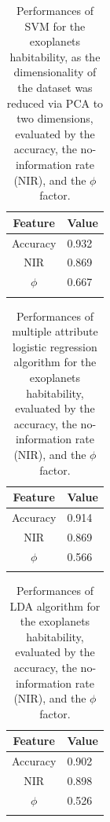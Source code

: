 \documentclass[
12pt, %
a4paper, %
oneside, %
headinclude,footinclude, %
BCOR5mm, %
]{scrartcl}
\begin{document}
\begin{table}[]
\caption{Performances of SVM for the exoplanets habitability, as the dimensionality of the dataset was reduced via PCA to two dimensions, evaluated by the accuracy, the no-information rate (NIR), and the $\phi$ factor.}
\begin{center}
\begin{tabular}{l|l}
\multicolumn{1}{c|}{Feature} & Value \\ \hline
\multicolumn{1}{c|}{Accuracy} & 0.932 \\ \hline
\multicolumn{1}{c|}{NIR} & 0.869 \\ \hline
\multicolumn{1}{c|}{$\phi$} & 0.667 \\ 
\label{SVM+PCA_perf_tab}
\end{tabular}
\end{center}
\end{table}

\begin{table}[]
\caption{Performances of multiple attribute logistic regression algorithm for the exoplanets habitability, evaluated by the accuracy, the no-information rate (NIR), and the $\phi$ factor.}
\begin{center}
\begin{tabular}{l|l}
\multicolumn{1}{c|}{Feature} & Value \\ \hline
\multicolumn{1}{c|}{Accuracy} & 0.914 \\ \hline
\multicolumn{1}{c|}{NIR} & 0.869 \\ \hline
\multicolumn{1}{c|}{$\phi$} & 0.566 \\ 
\label{LDA_perf_tab}
\end{tabular}
\end{center}
\end{table}

\begin{table}[]
\caption{Performances of LDA algorithm for the exoplanets habitability, evaluated by the accuracy, the no-information rate (NIR), and the $\phi$ factor.}
\begin{center}
\begin{tabular}{l|l}
\multicolumn{1}{c|}{Feature} & Value \\ \hline
\multicolumn{1}{c|}{Accuracy} & 0.902 \\ \hline
\multicolumn{1}{c|}{NIR} & 0.898 \\ \hline
\multicolumn{1}{c|}{$\phi$} & 0.526 \\ 
\label{LDA_perf_tab}
\end{tabular}
\end{center}
\end{table}
\end{document}
